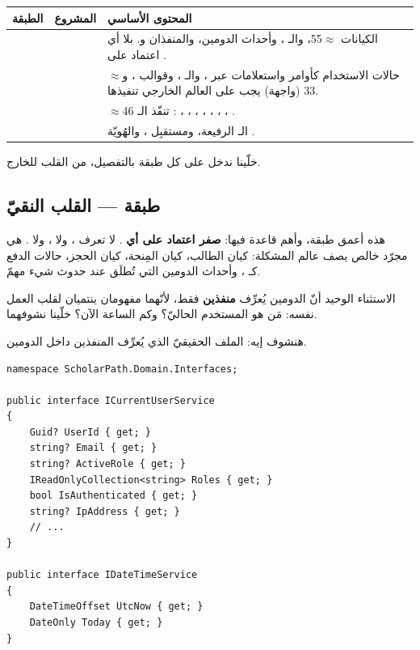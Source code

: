 \begin{center}
\begin{tabular}{L{2.3cm} L{3.7cm} L{8.8cm}}
\toprule
\textbf{\color{spPrimary}الطبقة} & \textbf{\color{spPrimary}المشروع } & \textbf{\color{spPrimary}المحتوى الأساسي} \\
\midrule
{} &  & الكيانات  $\approx$55، والـ ، وأحداث الدومين، والمنفذان  و. بلا أي اعتماد على . \\
 &  & حالات الاستخدام كأوامر واستعلامات  عبر ، والـ ، وقوالب ، و$\approx$33  (واجهة) يجب على العالم الخارجي تنفيذها. \\
 &  & $\approx$46  تنفّذ الـ : ، ، ، ، ، ، ، . \\
 &  & الـ  الرفيعة، ومستقبِل ، والهُويّة . \\
\bottomrule
\end{tabular}
\end{center}

خلّينا ندخل على كل طبقة بالتفصيل، من القلب للخارج.

\subsection{طبقة  — القلب النقيّ}

هذه أعمق طبقة، وأهم قاعدة فيها: \textbf{صفر اعتماد على أي }. لا تعرف
، ولا ، ولا . هي مجرّد  خالص
يصف عالم المشكلة: كيان الطالب، كيان المِنحة، كيان الحجز، حالات الدفع كـ ،
وأحداث الدومين  التي تُطلَق عند حدوث شيء مهمّ.

الاستثناء الوحيد أنّ الدومين يُعرِّف \textbf{منفذين}  فقط، لأنّهما مفهومان
ينتميان لقلب العمل نفسه: مَن هو المستخدم الحاليّ؟ وكم الساعة الآن؟ خلّينا نشوفهما.

هنشوف إيه: الملف الحقيقيّ الذي يُعرِّف المنفذين داخل الدومين.

\begin{english}
\begin{lstlisting}[language={[Sharp]C}]
namespace ScholarPath.Domain.Interfaces;

public interface ICurrentUserService
{
    Guid? UserId { get; }
    string? Email { get; }
    string? ActiveRole { get; }
    IReadOnlyCollection<string> Roles { get; }
    bool IsAuthenticated { get; }
    string? IpAddress { get; }
    // ...
}

public interface IDateTimeService
{
    DateTimeOffset UtcNow { get; }
    DateOnly Today { get; }
}
\end{lstlisting}
\end{english}


